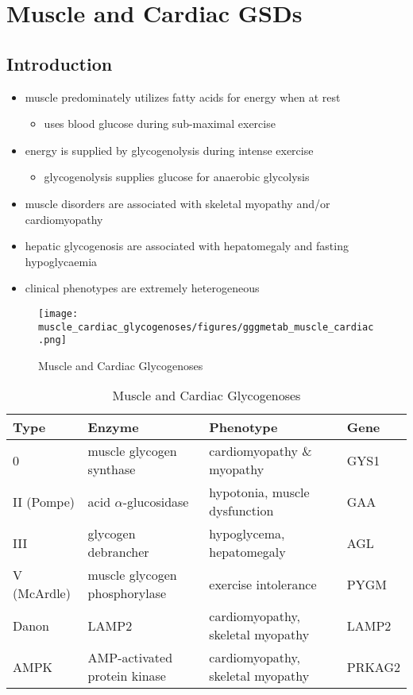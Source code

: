 \documentclass[12pt]{scrartcl}
\begin{document}
\section{Muscle and Cardiac GSDs}
\label{sec:org9d1bde3}
\subsection{Introduction}
\label{sec:orgea31d93}
\begin{itemize}
\item muscle predominately utilizes fatty acids for energy when at rest
\begin{itemize}
\item uses blood glucose during sub-maximal exercise
\end{itemize}
\item energy is supplied by glycogenolysis during intense exercise
\begin{itemize}
\item glycogenolysis supplies glucose for anaerobic glycolysis
\end{itemize}
\item muscle disorders are associated with skeletal myopathy and/or
cardiomyopathy
\item hepatic glycogenosis are associated with hepatomegaly and fasting
hypoglycaemia
\item clinical phenotypes are extremely heterogeneous
\end{itemize}

\begin{figure}[htbp]
\centering
\texttt{[image: muscle\_cardiac\_glycogenoses/figures/gggmetab\_muscle\_cardiac.png]}
\caption[Muscle and Cardiac Glycogenoses]{\label{fig:org19b0fa7}Muscle and Cardiac Glycogenoses}
\end{figure}

\begin{table}[htbp]
\caption{\label{tab:orgcf5794e}Muscle and Cardiac Glycogenoses}
\centering
\begin{tabular}{llll}
Type & Enzyme & Phenotype & Gene\\
\hline
0 & muscle glycogen synthase & cardiomyopathy \& myopathy & GYS1\\
II (Pompe) & acid \(\alpha\)-glucosidase & hypotonia, muscle dysfunction & GAA\\
III\footnotemark & glycogen debrancher & hypoglycema, hepatomegaly & AGL\\
V (McArdle) & muscle glycogen phosphorylase & exercise intolerance & PYGM\\
Danon & LAMP2 & cardiomyopathy, \textpm{} skeletal myopathy & LAMP2\\
AMPK & AMP-activated protein kinase & cardiomyopathy, \textpm{} skeletal myopathy & PRKAG2\\
\end{tabular}
\end{table}
\end{document}
